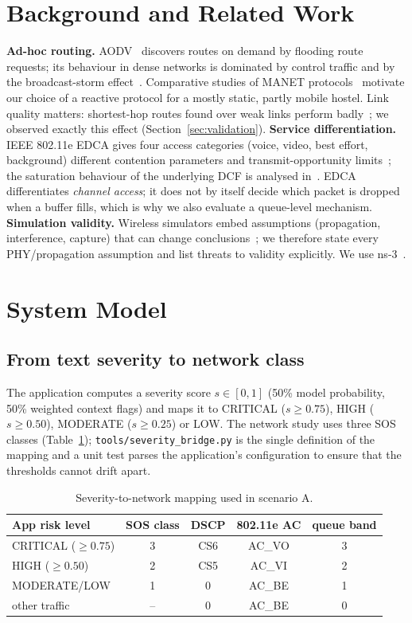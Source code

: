 \section{Background and Related Work}
\textbf{Ad-hoc routing.} AODV~\cite{rfc3561} discovers routes on demand by flooding route requests; its behaviour in dense networks is
dominated by control traffic and by the broadcast-storm effect~\cite{ni1999}. Comparative studies of MANET protocols~\cite{broch1998,das2000}
motivate our choice of a reactive protocol for a mostly static, partly mobile hostel. Link quality matters: shortest-hop routes found over
weak links perform badly~\cite{decouto2003}; we observed exactly this effect (Section~\ref{sec:validation}).
\textbf{Service differentiation.} IEEE 802.11e EDCA gives four access categories (voice, video, best effort, background) different
contention parameters and transmit-opportunity limits~\cite{ieee80211,mangold2003}; the saturation behaviour of the underlying
DCF is analysed in~\cite{bianchi2000}. EDCA differentiates \emph{channel access}; it does not by itself decide which packet is dropped when
a buffer fills, which is why we also evaluate a queue-level mechanism.
\textbf{Simulation validity.} Wireless simulators embed assumptions (propagation, interference, capture) that can change conclusions~\cite{kotz2004};
we therefore state every PHY/propagation assumption and list threats to validity explicitly. We use ns-3~\cite{riley2010}.

\section{System Model}
\subsection{From text severity to network class}
The application computes a severity score $s\in[0,1]$ (50\% model probability, 50\% weighted context flags) and maps it to
CRITICAL ($s\ge0.75$), HIGH ($s\ge0.50$), MODERATE ($s\ge0.25$) or LOW. The network study uses three SOS classes
(Table~\ref{tab:map}); \texttt{tools/severity\_bridge.py} is the single definition of the mapping and a unit test parses the application's
configuration to ensure that the thresholds cannot drift apart.
\begin{table}[t]\centering\caption{Severity-to-network mapping used in scenario A.}\label{tab:map}
\small\begin{tabular}{@{}lcccc@{}}\toprule
App risk level & SOS class & DSCP & 802.11e AC & queue band\\\midrule
CRITICAL ($\ge0.75$) & 3 & CS6 & AC\_VO & 3\\
HIGH ($\ge0.50$) & 2 & CS5 & AC\_VI & 2\\
MODERATE/LOW & 1 & 0 & AC\_BE & 1\\
other traffic & -- & 0 & AC\_BE & 0\\\bottomrule\end{tabular}\end{table}

